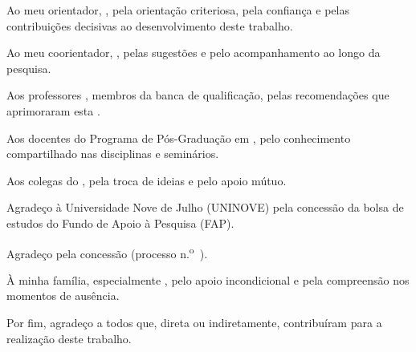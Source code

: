 \begin{agradecimentos}

  Ao meu orientador, , pela orientação
  criteriosa, pela confiança e pelas contribuições decisivas ao desenvolvimento
  deste trabalho.

  Ao meu coorientador, , pelas sugestões
  e pelo acompanhamento ao longo da pesquisa.

  Aos professores , membros da banca de qualificação, pelas
  recomendações que aprimoraram esta .

  Aos docentes do Programa de Pós-Graduação em , pelo conhecimento compartilhado
  nas disciplinas e seminários.

  Aos colegas do , pela troca de ideias
  e pelo apoio mútuo.

  Agradeço à Universidade Nove de Julho (UNINOVE) pela concessão da bolsa de
  estudos do Fundo de Apoio à Pesquisa (FAP).

  Agradeço  pela
  concessão 
  (processo n.\textsuperscript{o}~).


  À minha família, especialmente , pelo apoio incondicional
  e pela compreensão nos momentos de ausência.

  Por fim, agradeço a todos que, direta ou indiretamente, contribuíram para a
  realização deste trabalho.

\end{agradecimentos}